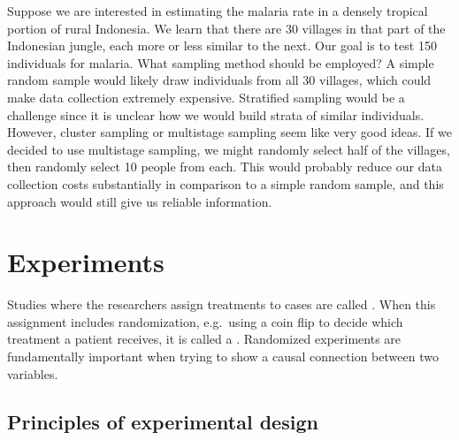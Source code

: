 \begin{example}{Suppose we are interested in estimating the malaria rate in a densely tropical portion of rural Indonesia. We learn that there are 30 villages in that part of the Indonesian jungle, each more or less similar to the next. Our goal is to test 150 individuals for malaria. What sampling method should be employed?}
A simple random sample would likely draw individuals from all 30 villages, which could make data collection extremely expensive. Stratified sampling would be a challenge since it is unclear how we would build strata of similar individuals. However, cluster sampling or multistage sampling seem like very good ideas. If we decided to use multistage sampling, we might randomly select half of the villages, then randomly select 10 people from each. This would probably reduce our data collection costs substantially in comparison to a simple random sample, and this approach would still give us reliable information.
\end{example}


\section[Experiments]{Experiments }
\label{experimentsSection}

Studies where the researchers assign treatments to cases are called . When this assignment includes randomization, e.g.~using a coin flip to decide which treatment a patient receives, it is called a . Randomized experiments are fundamentally important when trying to show a causal connection between two variables.

\subsection{Principles of experimental design}
\label{experimentalDesignPrinciples}

